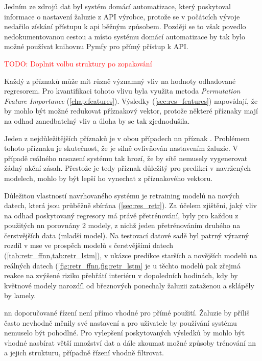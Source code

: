 Jedním ze zdrojů dat byl systém domácí automatizace, který poskytoval informace o nastavení žaluzie z API výrobce, protože se v počátcích vývoje nedařilo získání přístupu k \acrshort{api} běžným způsobem. Později se to však povedlo nedokumentovanou cestou a místo systému domácí automatizace by tak bylo možné používat knihovnu Pymfy pro přímý přístup k API.

\textcolor{red}{TODO: Doplnit volbu struktury po zopakování}

Každý z příznaků může mít různě významný vliv na hodnoty odhadované regresorem. Pro kvantifikaci tohoto vlivu byla využita metoda \emph{Permutation Feature Importance} (\cref{chap:features}). Výsledky (\cref{sec:res_features}) napovídají, že by mohlo být možné redukovat příznakový vektor, protože některé příznaky mají na odhad zanedbatelný vliv a úloha by se tak zjednodušila.

Jeden z nejdůležitějších příznaků je v obou případech \acrshort{nn} příznak . Problémem tohoto příznaku je skutečnost, že je silně ovlivňován nastavením žaluzie. V případě reálného nasazení systému tak hrozí, že by sítě nemusely vygenerovat žádný akční zásah. Přestože je tedy příznak důležitý pro predikci v navržených modelech, mohlo by být lepší ho vynechat z příznakového vektoru.

Důležitou vlastností navrhovaného systému je retraining modelů na nových datech, která jsou průběžně sbírána (\cref{sec:res_retr}). Za účelem zjištění, jaký vliv na odhad poskytovaný regresory má právě přetrénování, byly pro každou z použitých \acrshort{nn} porovnány 2 modely, z nichž jeden přetrénováním druhého na čerstvějších data (mladší model). Na testovací datové sadě byl patrný výrazný rozdíl v \acrshort{mse} ve prospěch modelů s čerstvějšími datech (\cref{tab:retr_ffnn,tab:retr_lstm}), v ukázce predikce starších a novějších modelů na reálných datech (\cref{fig:retr_ffnn,fig:retr_lstm} je u těchto modelů pak zřejmá reakce na zvýšené riziko přehřátí interiéru v dopoledních hodinách, kdy by květnové modely narozdíl od březnových ponechaly žaluzii zataženou a sklápěly by lamely.

\acrshort{nn} doporučované řízení není přímo vhodné pro přímé použití. Žaluzie by příliš často nevhodně měnily své nastavení a pro uživatele by používání systému nemuselo být pohodlné. Pro vylepšení poskytovaných výsledků by mohlo být vhodné nasbírat větší množství dat a dále zkoumat možné způsoby trénování \acrshort{nn} a jejich strukturu, případně řízení vhodně filtrovat.